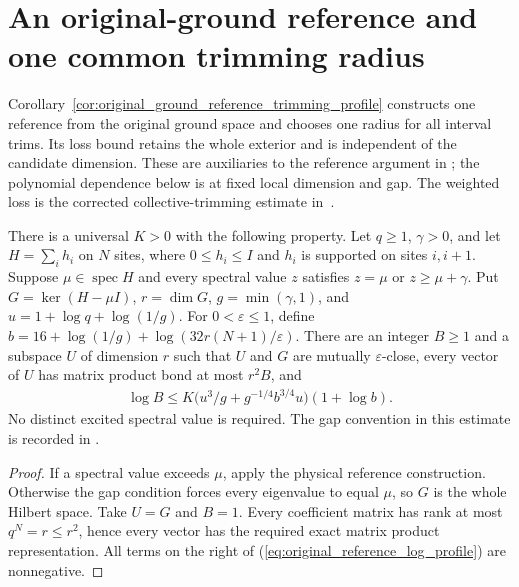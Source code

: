 \section{An original-ground reference and one common trimming radius}
\label{sec:original_ground_reference}

Corollary~\ref{cor:original_ground_reference_trimming_profile} constructs
one reference from the original ground space and chooses one radius for all
interval trims. Its loss bound retains the whole exterior and is independent
of the candidate dimension. These are auxiliaries to the reference argument
in \cite[lines 1801--1805]{Arad2016RigorousRG}; the polynomial dependence
below is at fixed local dimension and gap. The weighted loss is the corrected
collective-trimming estimate in~\cite{gap:alvv16_trimming_constant}.

\begin{lemma}
    \label{lem:original_ground_reference}
    \leanok
    There is a universal $K>0$ with the following property. Let $q\ge1$,
    $\gamma>0$, and let $H=\sum_i h_i$ on $N$ sites, where
    $0\le h_i\le I$ and $h_i$ is supported on sites $i,i+1$.
    Suppose $\mu\in\operatorname{spec}H$ and every spectral value $z$
    satisfies $z=\mu$ or $z\ge\mu+\gamma$. Put
    $G=\ker(H-\mu I)$, $r=\dim G$, $g=\min(\gamma,1)$, and
    $u=1+\log q+\log(1/g)$. For $0<\varepsilon\le1$, define
    $b=16+\log(1/g)+\log(32r(N+1)/\varepsilon)$.
    There are an integer $B\ge1$ and a subspace $U$ of dimension $r$ such
    that $U$ and $G$ are mutually $\varepsilon$-close, every vector of $U$
    has matrix product bond at most $r^2B$, and
    \begin{align}
        \log B\le K\bigl(u^3/g+g^{-1/4}b^{3/4}u\bigr)(1+\log b).
        \label{eq:original_reference_log_profile}
    \end{align}
    No distinct excited spectral value is required. The gap convention
    in this estimate is recorded in
    \cite{gap:alvv16_approximation_parameters}.
\end{lemma}
\begin{proof}\leanok
    If a spectral value exceeds $\mu$, apply the physical reference
    construction. Otherwise the gap condition forces every eigenvalue
    to equal $\mu$, so $G$ is the whole Hilbert space. Take $U=G$ and
    $B=1$. Every coefficient matrix has rank at most $q^N=r\le r^2$,
    hence every vector has the required exact matrix product
    representation. All terms on the right of
    (\ref{eq:original_reference_log_profile}) are nonnegative.
\end{proof}

